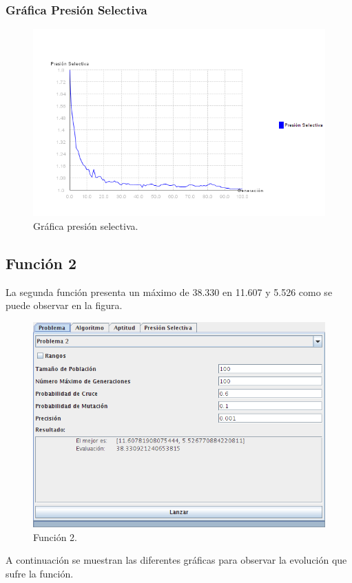 \documentclass[12pt]{article}
\begin{document}
\subsubsection*{Gráfica Presión Selectiva}
\begin{figure}[H]
\centering
\includegraphics[scale=0.5]{graficas/F1inicial_presion}
\caption{Gráfica presión selectiva.}
\label{fig}
\end{figure}
\newpage

\subsection{Función 2}
	La segunda función presenta un máximo de 38.330 en 11.607 y 5.526 como se puede observar en la figura.
\begin{figure}[H]
\centering
\includegraphics[scale=0.5]{graficas/F2inicial}
\caption{Función 2.}
\label{fig}
\end{figure}
	A continuación se muestran las diferentes gráficas para observar la evolución que sufre la función.
\end{document}
